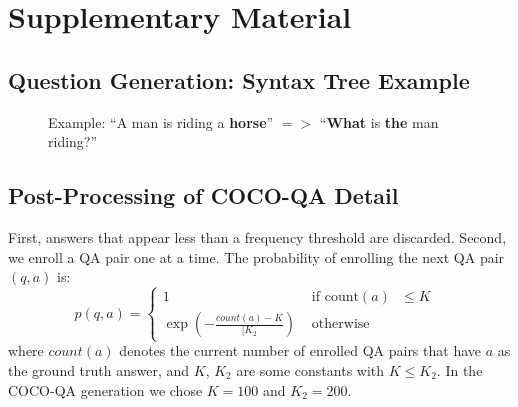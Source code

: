 \appendix
\section{Supplementary Material}
\subsection{Question Generation: Syntax Tree Example}
\begin{figure}[h!]
\centering
\small
{} 
\vspace{5mm}
\caption{Example: ``A man is riding a \textbf{horse}'' $=>$ ``\textbf{What} is 
\textbf{the} man riding?''}
\label{fig:what_gen}
\end{figure}

\subsection{Post-Processing of COCO-QA Detail}
\label{app:post_process}
First, answers that appear less than a frequency threshold are discarded.
Second, we enroll a QA pair one at a time.  The probability of enrolling the
next QA pair $(q, a)$ is:
\begin{equation}
p(q, a) = \left\{ \begin{array}{cl}
1 &\mbox{ if count$(a)$ $\le K$ } \\
\exp\left(-\frac{count(a) - K}{[K_2}\right) &\mbox{ otherwise }
\end{array} \right.
\end{equation}
where $count(a)$ denotes the current number of enrolled QA pairs that have $a$
as the ground truth answer, and $K$, $K_2$ are some constants with $K \le K_2$.
In the COCO-QA generation we chose $K = 100$ and $K_2 = 200$. 

\clearpage
